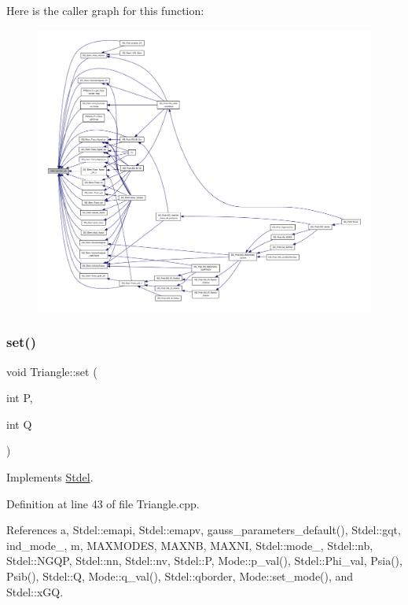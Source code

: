 Here is the caller graph for this function\+:
\nopagebreak
\begin{figure}[H]
\begin{center}
\leavevmode
\includegraphics[width=350pt]{classStdel_a457d20e34fb7a32eb1e4aca6c19f53a2_icgraph}
\end{center}
\end{figure}
\mbox{\label{classTriangle_a51d0da1119ccde5c695ea4da980bda8d}} 
\subsubsection{\texorpdfstring{set()}{set()}}
{\footnotesize\ttfamily void Triangle\+::set (\begin{DoxyParamCaption}\item[{int}]{P,  }\item[{int}]{Q }\end{DoxyParamCaption})\hspace{0.3cm}{\ttfamily [virtual]}}



Implements \hyperlink{classStdel_ab42c46493ab17be6f2642a558fea8a05}{Stdel}.



Definition at line 43 of file Triangle.\+cpp.



References a, Stdel\+::emapi, Stdel\+::emapv, gauss\+\_\+parameters\+\_\+default(), Stdel\+::gqt, ind\+\_\+mode\+\_\+, m, M\+A\+X\+M\+O\+D\+ES, M\+A\+X\+NB, M\+A\+X\+NI, Stdel\+::mode\+\_\+, Stdel\+::nb, Stdel\+::\+N\+G\+QP, Stdel\+::nn, Stdel\+::nv, Stdel\+::P, Mode\+::p\+\_\+val(), Stdel\+::\+Phi\+\_\+val, Psia(), Psib(), Stdel\+::Q, Mode\+::q\+\_\+val(), Stdel\+::qborder, Mode\+::set\+\_\+mode(), and Stdel\+::x\+GQ.

